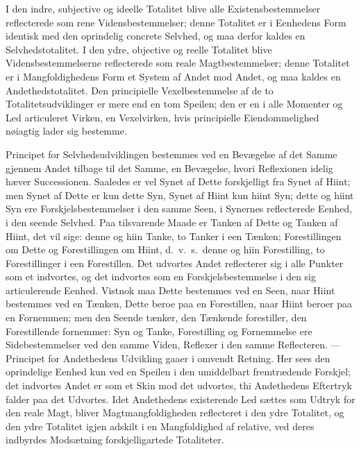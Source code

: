 \documentclass[12pt]{book}
\newcommand{\opage}[1]{\marginnote{\footnotesize\textit{[#1]}}}
\begin{document}
I den indre, subjective og ideelle Totalitet blive alle Existensbestemmelser reflecterede
som rene Vidensbestemmelser; denne Totalitet er i Eenhedens Form identisk med den
oprindelig concrete Selvhed, og maa derfor kaldes en Selvhedstotalitet. I den ydre,
objective og reelle Totalitet blive Vidensbestemmelserne reflecterede som reale
Magtbestemmelser; denne Totalitet er i Mangfoldighedens Form et System af Andet mod
Andet, og maa kaldes en Andethedstotalitet. Den principielle Vexelbestemmelse af de to
Totalitetsudviklinger er mere end en tom Speilen; den er en i alle Momenter og Led
articuleret Virken, en Vexelvirken, hvis principielle Eiendommelighed nøiagtig lader sig
bestemme.

Principet for Selvhedsudviklingen bestemmes ved en Bevægelse af det Samme gjennem Andet
tilbage til det Samme, en Bevægelse, hvori Reflexionen idelig hæver Successionen. Saaledes
er vel Synet af Dette forskjelligt fra Synet af Hiint; men Synet af Dette er kun dette
Syn, Synet af Hiint kun hiint Syn; dette og hiint Syn ere Forskjelsbestemmelser i den
samme Seen, i Synernes reflecterede Eenhed, i den seende Selvhed. Paa tilsvarende Maade
er Tanken af Dette og Tanken af Hiint, det vil sige: denne og hiin Tanke, to Tanker i een
Tænken; Forestillingen om Dette og Forestillingen om Hiint, d.\ v.\ s.\ denne og hiin
Forestilling, to Forestillinger i een Forestillen. Det udvortes Andet reflecterer sig i
alle Punkter som et indvortes, og det indvortes som en Forskjelsbestemmelse i den sig
articulerende Eenhed. Vistnok maa Dette bestemmes ved en Seen, naar Hiint bestemmes
\opage{127} ved en Tænken, Dette beroe paa en Forestillen, naar Hiint beroer paa en Fornemmen; men
den Seende tænker, den Tænkende forestiller, den Forestillende fornemmer: Syn og Tanke,
Forestilling og Fornemmelse ere Sidebestemmelser ved den samme Viden, Reflexer i den
samme Reflecteren. --- Principet for Andethedens Udvikling gaaer i omvendt Retning. Her
sees den oprindelige Eenhed kun ved en Speilen i den umiddelbart fremtrædende Forskjel;
det indvortes Andet er som et Skin mod det udvortes, thi Andethedens Eftertryk falder paa
det Udvortes. Idet Andethedens existerende Led sættes som Udtryk for den reale Magt,
bliver Magtmangfoldigheden reflecteret i den ydre Totalitet, og den ydre Totalitet igjen
adskilt i en Mangfoldighed af relative, ved deres indbyrdes Modsætning forskjelligartede
Totaliteter.
\end{document}
